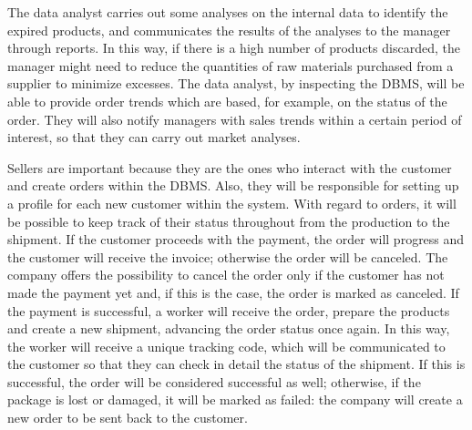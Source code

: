 The data analyst carries out some analyses on the internal data to identify the expired products, and communicates the results of the analyses to the manager through reports. In this way, if there is a high number of products discarded, the manager might need to reduce the quantities of raw materials purchased from a supplier to minimize excesses. The data analyst, by inspecting the DBMS, will be able to provide order trends which are based, for example, on the status of the order. They will also notify managers with sales trends within a certain period of interest, so that they can carry out market analyses.

Sellers are important because they are the ones who interact with the customer and create orders within the DBMS. Also, they will be responsible for setting up a profile for each new customer within the system. With regard to orders, it will be possible to keep track of their status throughout from the production to the shipment. If the customer proceeds with the payment, the order will progress and the customer will receive the invoice; otherwise the order will be canceled. The company offers the possibility to cancel the order only if the customer has not made the payment yet and, if this is the case, the order is marked as canceled. If the payment is successful, a worker will receive the order, prepare the products and create a new shipment, advancing the order status once again. In this way, the worker will receive a unique tracking code, which will be communicated to the customer so that they can check in detail the status of the shipment. If this is successful, the order will be considered successful as well; otherwise, if the package is lost or damaged, it will be marked as failed: the company will create a new order to be sent back to the customer.

